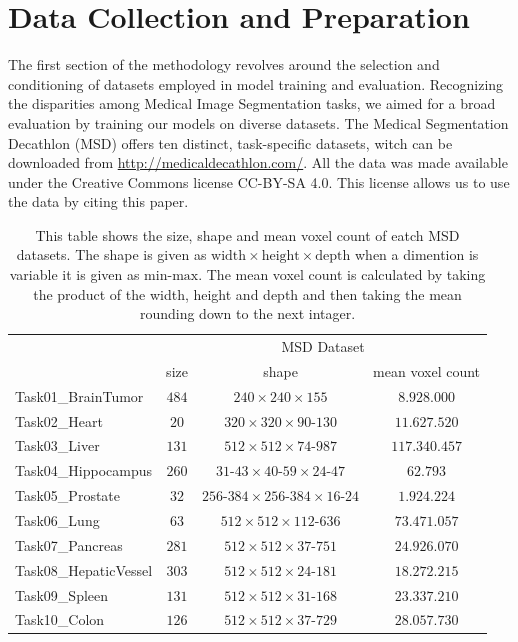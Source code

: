 \section{Data Collection and Preparation}
The first section of the methodology revolves around the selection and conditioning of datasets employed in model training and evaluation.
Recognizing the disparities among Medical Image Segmentation tasks, we aimed for a broad evaluation by training our models on diverse datasets.
The Medical Segmentation Decathlon (MSD) offers ten distinct, task-specific datasets, witch can be downloaded from \url{http://medicaldecathlon.com/}.
All the data was made available under the Creative Commons license CC-BY-SA 4.0. This license allows us to use the data by citing this paper.\cite[7]{simpson_large_2019}
\newpage
\begin{table}[ht!]
\begin{center} {\footnotesize
\begin{tabular}{lccc}
\hline
	& \multicolumn{3}{c}{MSD Dataset}  \\
	& \multicolumn{1}{c}{size} & \multicolumn{1}{c}{shape} & \multicolumn{1}{c}{mean voxel count}\\
\hline
Task01\_BrainTumor & $484$ & $240\times240\times155$ & $8.928.000$ \\[1ex]
Task02\_Heart & $20$ & $320\times320\times90\mbox{-}130$ & $11.627.520$ \\[1ex]
Task03\_Liver & $131$ & $512\times512\times74\mbox{-}987$ & $117.340.457$ \\[1ex]
Task04\_Hippocampus & $260$ & $31\mbox{-}43\times40\mbox{-}59\times24\mbox{-}47$ & $62.793$ \\[1ex]
Task05\_Prostate & $32$ & $256\mbox{-}384\times256\mbox{-}384\times16\mbox{-}24$ & $1.924.224$ \\[1ex]
Task06\_Lung & $63$ & $512\times512\times112\mbox{-}636$ & $73.471.057$ \\[1ex]
Task07\_Pancreas & $281$ & $512\times512\times37\mbox{-}751$ & $24.926.070$ \\[1ex]
Task08\_HepaticVessel & $303$ & $512\times512\times24\mbox{-}181$ & $18.272.215$ \\[1ex]
Task09\_Spleen & $131$ & $512\times512\times31\mbox{-}168$ & $23.337.210$ \\[1ex]
Task10\_Colon & $126$ & $512\times512\times37\mbox{-}729$ & $28.057.730$ \\[1ex]
\hline
\end{tabular} }
\end{center}
\caption{\footnotesize This table shows the size, shape and mean voxel count of eatch MSD datasets.
The shape is given as $\text{width}\times \text{height}\times \text{depth}$ when a dimention is variable it is given as $\text{min}\mbox{-}\text{max}$.
The mean voxel count is calculated by taking the product of the width, height and depth and then taking the mean rounding down to the next intager.}
\label{turns}
\end{table}
